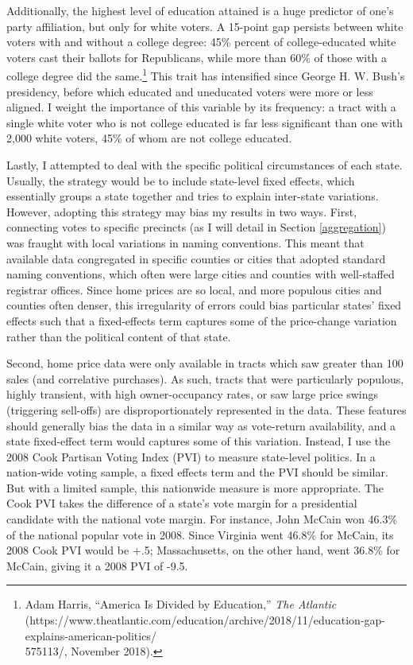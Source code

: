 \documentclass[12pt,oneside]{psthesis}
\begin{document}
Additionally, the highest level of education attained is a huge predictor of one's party affiliation, but only for white voters.
A 15-point gap persists between white voters with and without a college degree: 45\% percent of college-educated white voters cast their ballots for Republicans, while more than 60\% of those with a college degree did the same.\footnote{Adam Harris, ``America Is Divided by Education,'' \emph{The Atlantic} (https://www.theatlantic.com/education/archive/2018/11/education-gap-explains-american-politics/\\575113/, November 2018).}
This trait has intensified since George H. W. Bush's presidency, before which educated and uneducated voters were more or less aligned.
I weight the importance of this variable by its frequency: a tract with a single white voter who is not college educated is far less significant than one with 2,000 white voters, 45\% of whom are not college educated.

Lastly, I attempted to deal with the specific political circumstances of each state.
Usually, the strategy would be to include state-level fixed effects, which essentially groups a state together and tries to explain inter-state variations.
However, adopting this strategy may bias my results in two ways.
First, connecting votes to specific precincts (as I will detail in Section \ref{aggregation}) was fraught with local variations in naming conventions.
This meant that available data congregated in specific counties or cities that adopted standard naming conventions, which often were large cities and counties with well-staffed registrar offices.
Since home prices are so local, and more populous cities and counties often denser, this irregularity of errors could bias particular states' fixed effects such that a fixed-effects term captures some of the price-change variation rather than the political content of that state.

Second, home price data were only available in tracts which saw greater than 100 sales (and correlative purchases).
As such, tracts that were particularly populous, highly transient, with high owner-occupancy rates, or saw large price swings (triggering sell-offs) are disproportionately represented in the data.
These features should generally bias the data in a similar way as vote-return availability, and a state fixed-effect term would captures some of this variation.
Instead, I use the 2008 Cook Partisan Voting Index (PVI) to measure state-level politics.
In a nation-wide voting sample, a fixed effects term and the PVI should be similar.
But with a limited sample, this nationwide measure is more appropriate.
The Cook PVI takes the difference of a state's vote margin for a presidential candidate with the national vote margin.
For instance, John McCain won 46.3\% of the national popular vote in 2008.
Since Virginia went 46.8\% for McCain, its 2008 Cook PVI would be +.5; Massachusetts, on the other hand, went 36.8\% for McCain, giving it a 2008 PVI of -9.5.
\end{document}
